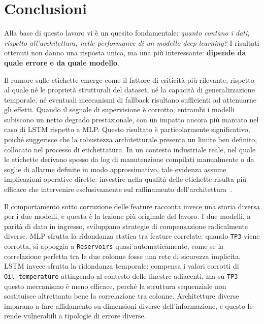 \documentclass[../main.tex]{subfiles}
\begin{document}
\chapter{Conclusioni}
\label{chap:conclusion}

Alla base di questo lavoro vi è un quesito fondamentale: \textit{quanto contano i dati, rispetto all'architettura, nelle performance di un modello deep learning?} I risultati ottenuti non danno una risposta unica, ma una più interessante: \textbf{dipende da quale errore e da quale modello}.

Il rumore sulle etichette emerge come il fattore di criticità più rilevante, rispetto al quale né le proprietà strutturali del dataset, né la capacità di generalizzazione temporale, né eventuali meccanismi di fallback risultano sufficienti ad attenuarne gli effetti. Quando il segnale di supervisione è corrotto, entrambi i modelli subiscono un netto degrado prestazionale, con un impatto ancora più marcato nel caso di LSTM rispetto a MLP. Questo risultato è particolarmente significativo, poiché suggerisce che la robustezza architetturale presenta un limite ben definito, collocato nel processo di etichettatura. In un contesto industriale reale, nel quale le etichette derivano spesso da log di manutenzione compilati manualmente o da soglie di allarme definite in modo approssimativo, tale evidenza assume implicazioni operative dirette: investire nella qualità delle etichette risulta più efficace che intervenire esclusivamente sul raffinamento dell'architettura~\cite{jakubik2024datacentricartificialintelligence}.

Il comportamento sotto corruzione delle feature racconta invece una storia diversa per i due modelli, e questa è la lezione più originale del lavoro. I due modelli, a parità di dato in ingresso, sviluppano strategie di compensazione radicalmente diverse. MLP sfrutta la ridondanza statica tra feature correlate: quando \texttt{TP3} viene corrotta, si appoggia a \texttt{Reservoirs} quasi automaticamente, come se la correlazione perfetta tra le due colonne fosse una rete di sicurezza implicita. LSTM invece sfrutta la ridondanza temporale: compensa i valori corrotti di \texttt{Oil\_temperature} attingendo al contesto delle finestre adiacenti, ma su \texttt{TP3} questo meccanismo è meno efficace, perché la struttura sequenziale non sostituisce altrettanto bene la correlazione tra colonne. Architetture diverse imparano a fare affidamento su dimensioni diverse dell'informazione, e questo le rende vulnerabili a tipologie di errore diverse.
\end{document}
